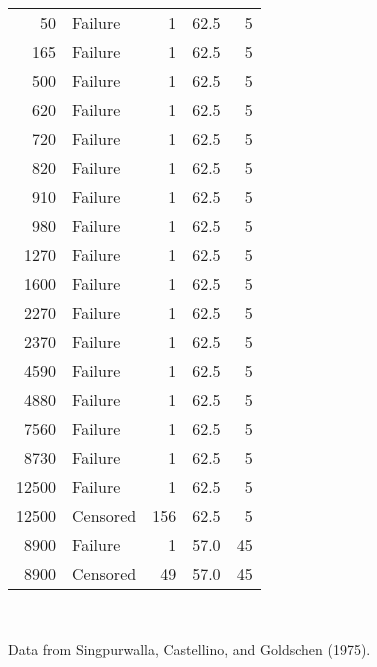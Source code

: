 \begin{table}
\begin{tabular}{rlrrr}
 50&    Failure&1&62.5&5\\
 165&   Failure&1&62.5&5\\
 500&   Failure&1&62.5&5\\
 620&   Failure&1&62.5&5\\
 720&   Failure&1&62.5&5\\
 820&   Failure&1&62.5&5\\
 910&   Failure&1&62.5&5\\
 980&   Failure&1&62.5&5\\
 1270&  Failure&1&62.5&5\\
 1600&  Failure&1&62.5&5\\
 2270&  Failure&1&62.5&5\\
 2370&  Failure&1&62.5&5\\
 4590&  Failure&1&62.5&5\\
 4880&  Failure&1&62.5&5\\
 7560&  Failure&1&62.5&5\\
 8730&  Failure&1&62.5&5\\
12500&  Failure&1&62.5&5\\
12500&  Censored&156&62.5&5\\
 8900&  Failure&1&57.0&45\\
 8900&  Censored&49&57.0&45\\
\hline
\end{tabular}\\
\begin{minipage}[t]{4in}
Data from Singpurwalla, Castellino, and Goldschen (1975).
\end{minipage}
\label{atable:tantalum.alt.data}
\end{table}

\clearpage


